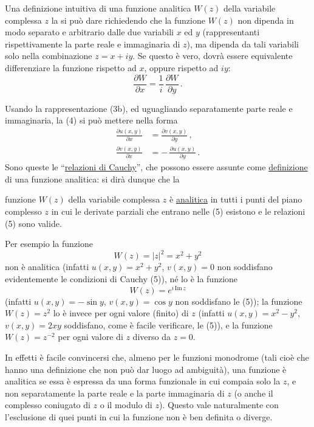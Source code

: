 \documentclass[11pt, a4paper]{book}
\numberwithin{equation}{section}
\begin{document}
Una definizione intuitiva di una funzione analitica $W(z)$ della variabile complessa $z$ la si può dare richiedendo che la funzione $W(z)$ non dipenda in modo separato e arbitrario dalle due variabili $x$ ed $y$ (rappresentanti rispettivamente la parte reale e immaginaria di $z$), ma dipenda da tali variabili solo nella combinazione $z = x + iy$. Se questo è vero, dovrà essere equivalente differenziare la funzione rispetto ad $x$, oppure rispetto ad $iy$:
\begin{equation}
\frac{\partial W}{\partial x} = \frac{1}{i}\,\frac{\partial W}{\partial y}\,. \tag{4}
\end{equation}

Usando la rappresentazione (3b), ed uguagliando separatamente parte reale e immaginaria, la (4) si può mettere nella forma
\begin{align}
\frac{\partial u(x,y)}{\partial x} &= \frac{\partial v(x,y)}{\partial y}\,, \tag{5a}\\
\frac{\partial v(x,y)}{\partial x} &= -\,\frac{\partial u(x,y)}{\partial y}\,. \tag{5b}
\end{align}
Sono queste le ``\underline{relazioni di Cauchy}'', che possono essere assunte come \underline{definizione} di una funzione analitica: si dirà dunque che la


funzione $W(z)$ della variabile complessa $z$ è \underline{analitica} in tutti i punti del piano complesso $z$ in cui le derivate parziali che entrano nelle (5) esistono e le relazioni (5) sono valide.

Per esempio la funzione
\begin{equation}
W(z) = |z|^2 = x^2 + y^2 \tag{6a}
\end{equation}
non è analitica (infatti $u(x,y) = x^2 + y^2$, $v(x,y) = 0$ non soddisfano evidentemente le condizioni di Cauchy (5)), né lo è la funzione
\begin{equation}
W(z) = e^{i\,\mathrm{Im}\, z} \tag{6b}
\end{equation}
(infatti $u(x,y) = -\sin y$, $v(x,y) = \cos y$ non soddisfano le (5)); la funzione $W(z) = z^2$ lo è invece per ogni valore (finito) di $z$ (infatti $u(x,y) = x^2 - y^2$, $v(x,y) = 2xy$ soddisfano, come è facile verificare, le (5)), e la funzione $W(z) = z^{-2}$ per ogni valore di $z$ diverso da $z=0$.

In effetti è facile convincersi che, almeno per le funzioni monodrome (tali cioè che hanno una definizione che non può dar luogo ad ambiguità), una funzione è analitica se essa è espressa da una forma funzionale in cui compaia solo la $z$, e non separatamente la parte reale e la parte immaginaria di $z$ (o anche il complesso coniugato di $z$ o il modulo di $z$). Questo vale naturalmente con l'esclusione di quei punti in cui la funzione non è ben definita o diverge.
\end{document}
